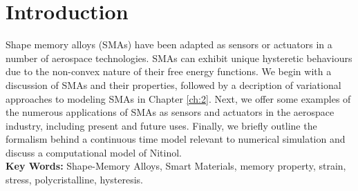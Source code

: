 \chapter{Introduction}

\begin{tcolorbox}[title=Abstract,colbacktitle=white!80!black,coltitle=black,arc=0mm,boxrule=0.1mm]
Shape memory alloys (SMAs) have been adapted as sensors or actuators in a number of aerospace technologies. SMAs can exhibit unique hysteretic behaviours due to the non-convex nature of their free energy functions. We begin with a discussion of SMAs and their properties, followed by a decription of variational approaches to modeling SMAs in Chapter \ref{ch:2}. Next, we offer some examples of the numerous applications of SMAs as sensors and actuators in the aerospace industry, including present and future uses. Finally, we briefly outline the formalism behind a continuous time model relevant to numerical simulation and discuss a computational model of Nitinol.\\

{\footnotesize\hspace{5mm}\textbf{Key Words:} Shape-Memory Alloys, Smart Materials, memory property, strain, stress, polycristalline, hysteresis.} %
\end{tcolorbox}

